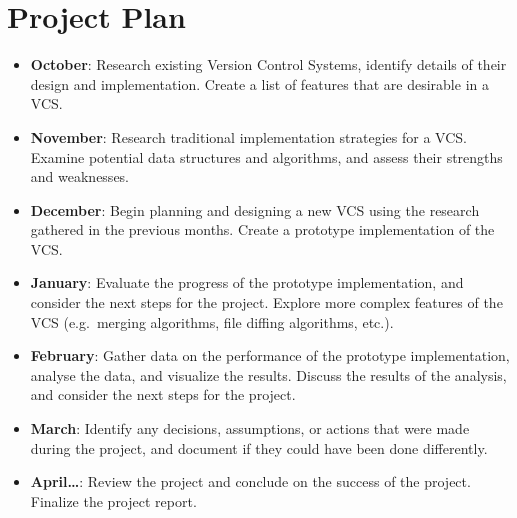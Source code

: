 \documentclass[a4paper,12pt]{article}
\begin{document}
\section*{Project Plan}
\begin{itemize}
    \item \textbf{October}: Research existing Version Control Systems, identify details of their design and implementation. Create a list of features that are desirable in a VCS\@.
    \item \textbf{November}: Research traditional implementation strategies for a VCS\@. Examine potential data structures and algorithms, and assess their strengths and weaknesses.
    \item \textbf{December}: Begin planning and designing a new VCS using the research gathered in the previous months. Create a prototype implementation of the VCS\@.
    \item \textbf{January}: Evaluate the progress of the prototype implementation, and consider the next steps for the project. Explore more complex features of the VCS (e.g.\ merging algorithms, file diffing algorithms, etc.).
    \item \textbf{February}: Gather data on the performance of the prototype implementation, analyse the data, and visualize the results. Discuss the results of the analysis, and consider the next steps for the project.
    \item \textbf{March}: Identify any decisions, assumptions, or actions that were made during the project, and document if they could have been done differently.
    \item \textbf{April\ldots}: Review the project and conclude on the success of the project. Finalize the project report.
\end{itemize}



\end{document}
